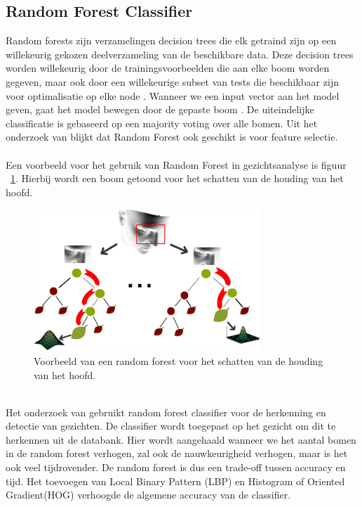 \subsection{Random Forest Classifier}
\label{sub:randomforest}
Random forests zijn verzamelingen decision trees die elk getraind zijn op een willekeurig gekozen deelverzameling van de beschikbare data. Deze decision trees worden willekeurig door de trainingsvoorbeelden die aan elke boom worden gegeven,  maar ook door een willekeurige subset van tests die beschikbaar zijn voor optimalisatie op elke node \autocite{Fanelli2012}. Wanneer we een input vector aan het model geven, gaat het model bewegen door de gepaste boom \autocite{Chen2011}. De uiteindelijke classificatie is gebaseerd op een majority voting over alle bomen. Uit het onderzoek van \textcite{Wang2010} blijkt dat Random Forest ook geschikt is voor feature selectie. \\
\\
Een voorbeeld voor het gebruik van Random Forest in gezichtsanalyse is figuur {~\ref{fig:randomforest}}. Hierbij wordt een boom getoond voor het  schatten van de houding van het hoofd. 
\begin{figure}
    \centering
    \includegraphics{graphics/headposition.png}
    \caption[Random forest voor houding van het hoofd]{\label{fig:randomforest}Voorbeeld van een random forest voor het schatten van de houding van het hoofd\autocite{Fanelli2012}.}
\end{figure}
\\
Het onderzoek van \textcite{Mady2018} gebruikt random forest classifier voor de herkenning en detectie van gezichten. De classifier wordt toegepast op het gezicht om dit te herkennen uit de databank. Hier wordt aangehaald wanneer we het aantal bomen in de random forest verhogen, zal ook de nauwkeurigheid verhogen, maar is het ook veel tijdrovender. De random forest is dus een trade-off tussen accuracy en tijd. Het toevoegen van Local Binary Pattern (LBP) en Histogram of Oriented Gradient(HOG) verhoogde de algemene accuracy van de classifier. 

